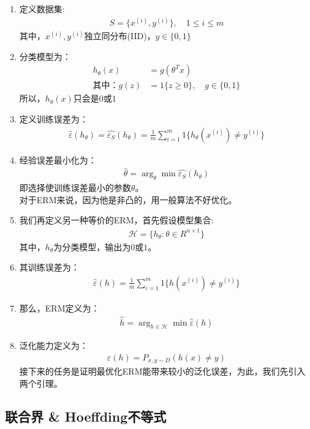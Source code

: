 \begin{enumerate}
	\item 定义数据集:
	\begin{align}
		S = \{x^{(i)}, y^{(i)}\}, \quad 1 \leq i \leq m
	\end{align}
	其中，$x^{(i)}, y^{(i)}$独立同分布(IID)，$y \in \{0, 1\}$
	\item 分类模型为：
	\begin{align}
		h_{\theta}(x) &= g(\theta^Tx) \\
		\text{其中：}
		g(z) &= 1\{z\geq 0\}, \quad g \in \{0, 1\}
	\end{align}
	所以，$h_{\theta}(x)$只会是$0$或$1$
	\item 定义训练误差为：
	\begin{align}
		\hat{\varepsilon}(h_{\theta}) = \hat{\varepsilon_S}(h_{\theta}) = \frac{1}{m}\sum_{i=1}^{m}1\{h_{\theta}(x^{(i)}) \neq y^{(i)}\}
	\end{align}
	\item 经验误差最小化为：
	\begin{align}
		\hat{\theta} = \arg_{\theta}\min{\hat{\varepsilon_S}(h_{\theta})}
	\end{align}
	即选择使训练误差最小的参数$\theta$。\\
	对于ERM来说，因为他是非凸的，用一般算法不好优化。
	\item 我们再定义另一种等价的ERM，首先假设模型集合:
	\begin{align}
		\mathcal{H} = \{h_{\theta}: \theta \in R^{n\times 1}\}
	\end{align}
	其中，$h_{\theta}$为分类模型，输出为$0$或$1$。
	\item 其训练误差为：
	\begin{align}
		\hat{\varepsilon}(h) = \frac{1}{m}\sum_{i=1}^{m}1\{h(x^{(i)}) \neq y^{(i)}\}
	\end{align}
	\item 那么，ERM定义为：
	\begin{align}
		\hat{h} = \arg_{h \in \mathcal{H}} \min{\hat{\varepsilon}(h)}
	\end{align}
	\item 泛化能力定义为：
	\begin{align}
		\varepsilon(h) = P_{x,y \sim D} (h(x) \neq y)
	\end{align}
	接下来的任务是证明最优化ERM能带来较小的泛化误差，为此，我们先引入两个引理。
\end{enumerate}


\subsection{联合界 \& Hoeffding不等式}
